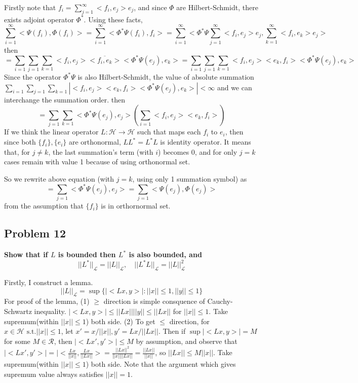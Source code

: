 \documentclass{article}
\begin{document}
Firstly note that $f_i=\sum_{j=1}^\infty<f_i,e_j>e_j$, 
and since $\Phi$ are Hilbert-Schmidt, there exists adjoint operator  $\Phi^*$.
Using these facts,
\[\sum_{i=1}^{\infty} <\Psi(f_i), \Phi(f_i)>
= \sum_{i=1}^{\infty} <\Phi^*\Psi(f_i), f_i> 
= \sum_{i=1}^\infty <\Phi^*\Psi\sum_{j=1}^\infty <f_i,e_j>e_j, \sum_{k=1}^\infty <f_i,e_k>e_j>\]
then
\[=\sum _{i=1}\sum_{j=1}\sum_{k=1}<f_i,e_j>\overline{<f_i,e_k>}<\Phi^*\Psi(e_j),e_k>
=\sum _{i=1}\sum_{j=1}\sum_{k=1}<f_i,e_j><e_k,f_i><\Phi^*\Psi(e_j),e_k>\]
Since the operator $\Phi^*\Psi$ is also Hilbert-Schmidt, the value of absolute summation
\(\sum _{i=1}\sum_{j=1}\sum_{k=1}|<f_i,e_j><e_k,f_i><\Phi^*\Psi(e_j),e_k>|<\infty\)
and we can interchange the summation order. then
\[=\sum_{j=1}\sum_{k=1}<\Phi^*\Psi(e_j),e_j>(\sum_{i=1}<f_i,e_j><e_k,f_i>)\]
If we think the linear operator $L:\mathcal{H}\rightarrow\mathcal{H}$ such that
maps each $f_i$ to $e_i$, then since both $\{f_i\}, \{e_i\}$ are orthonormal, 
$LL^*=L^*L$ is identity operator.
It means that, for $j\neq k$, the last summation's term (with $i$) becomes 0,
and for only $j=k$ cases remain with value 1 because of using orthonormal set.

So we rewrite above equation (with $j=k$, using only 1 summation symbol) as
\[=\sum_{j=1} <\Phi^*\Psi(e_j),e_j>
=\sum_{j=1} <\Psi(e_j),\Phi(e_j)>\]
from the assumption that $\{f_i\}$ is in orthornormal set.




\subsection{Problem 12}
\textbf{
    Show that if $L$ is bounded then $L^*$ is also bounded, and
    \[||L^*||_{\mathcal{L}}=||L||_{\mathcal{L}}, \quad  
    ||L^*L||_{\mathcal{L}}=||L||^2_{\mathcal{L}}
    \]
}

Firstly, I construct a lemma.
\[||L||_{\mathcal{L}} = \sup\{|<Lx,y>|:||x||\leq 1, ||y||\leq 1\}\]
For proof of the lemma, (1) $\geq$ direction is simple consquence of Cauchy-Schwartz inequality.
\(|<Lx,y>|\leq ||Lx||||y|| \leq ||Lx||\) for $||x||\leq 1$. Take supremum(within $||x||\leq 1$) both side.
(2) To get $\leq$ direction, for $x\in \mathcal{H} \text{ s.t.} ||x||\leq 1$,
let $x'=x/||x||, y'=Lx/||Lx||$. Then if $\sup|<Lx,y>|= M$ for some $M\in\mathcal{R}$, then $|<Lx',y'>|\leq M$ by assumption, and observe that
\(|<Lx',y'>|=|<\frac{Lx}{||x||},\frac{Lx}{||Lx||}>=\frac{||Lx||^2}{||x||||Lx||}=\frac{||Lx||}{||x||}\), so
$||Lx||\leq M||x||$. Take supremum(within $||x||\leq 1$) both side. Note that the argument which gives supremum value always satisfies $||x||=1$.
\end{document}
